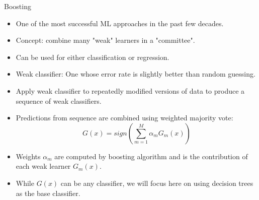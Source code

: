 \documentclass{beamer}
\begin{document}
\begin{frame}{Boosting}
    \begin{itemize}
        \item One of the most successful ML approaches in the past few decades.
        \item Concept: combine many "weak" learners in a "committee".
        \item Can be used for either classification or regression.
        \item Weak classifier: One whose error rate is slightly better than random guessing.
        \item Apply weak classifier to repeatedly modified versions of data to produce a sequence of weak classifiers.
        \item Predictions from sequence are combined using weighted majority vote:
        \begin{equation*}
            G(x) = sign\left( \sum_{m=1}^M \alpha_mG_m(x)\right)
        \end{equation*}
        \item Weights $\alpha_m$ are computed by boosting algorithm and is the contribution of each weak learner $G_m(x)$.
        \item While $G(x)$ can be any classifier, we will focus here on using decision trees as the base classifier.
    \end{itemize}
\end{frame}
\end{document}

